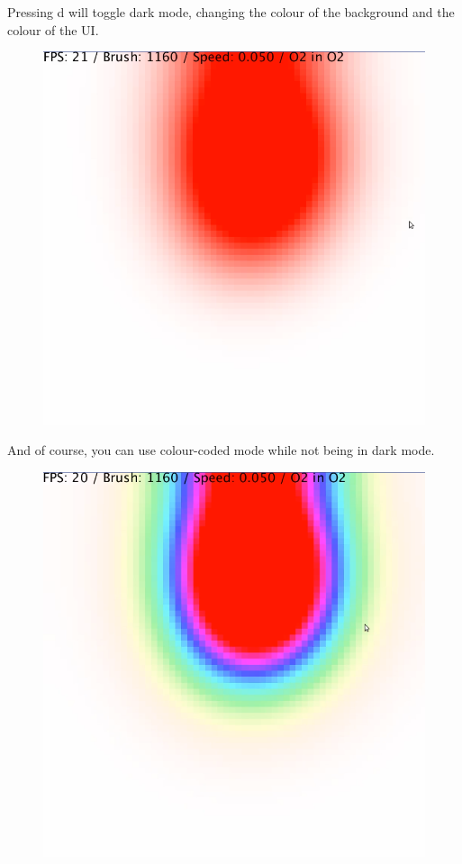\documentclass[12pt,a4paper]{book}
\begin{document}
\pagebreak
Pressing d will toggle dark mode, changing the colour of the background and the colour of the UI.

\begin{figure}[H]
	\includegraphics[scale=0.5]{pics/13.png}
\end{figure}

\pagebreak
And of course, you can use colour-coded mode while not being in dark mode.

\begin{figure}[H]
	\includegraphics[scale=0.5]{pics/14.png}
\end{figure}
\end{document}
